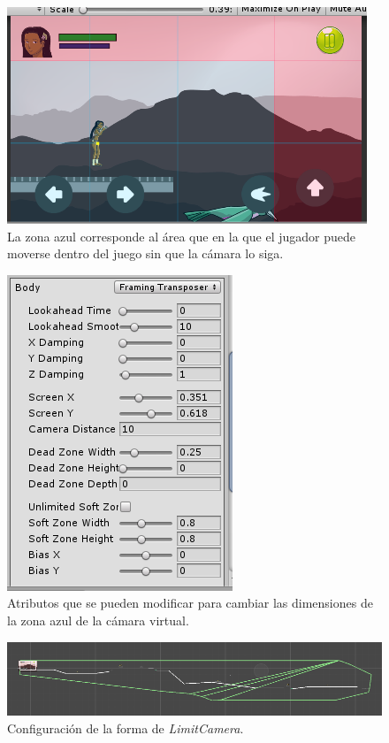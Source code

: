\begin{figure}[h]
		\centering
		\includegraphics[height=0.2 \textheight]{03TrabajoRealizado/imagenes/cinemachine0003.png}
		\caption{La zona azul corresponde al área que en la que el jugador puede moverse dentro del juego sin que la cámara lo siga.}
		\label{fig:CameraZones}
\end{figure}

\begin{figure}[h]
		\centering
		\includegraphics[height=0.2 \textheight]{03TrabajoRealizado/imagenes/cinemachine0004.png}
		\caption{Atributos que se pueden modificar para cambiar las dimensiones de la zona azul de la cámara virtual.}
		\label{fig:CameraAttibutes}
\end{figure}

\begin{figure}[h]
		\centering
		\includegraphics[height=0.1 \textheight]{03TrabajoRealizado/imagenes/cinemachine0005.png}
		\caption{Configuración de la forma de \textit{LimitCamera}.}
		\label{fig:CameraLimit}
\end{figure}


